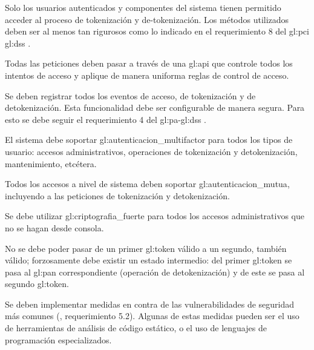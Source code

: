 {
  Solo los usuarios autenticados y componentes del sistema tienen permitido
  acceder al proceso de tokenización y de-tokenización. Los métodos utilizados
  deben ser al menos tan rigurosos como lo indicado en el requerimiento 8 del
  \gls{gl:pci} \gls{gl:dss} \cite{pci_dss}.

  {
    Todas las peticiones deben pasar a través de una \gls{gl:api} que controle
    todos los intentos de acceso y aplique de manera uniforma reglas de
    control de acceso.
  }

  {
    Se deben registrar todos los eventos de acceso, de tokenización y
    de detokenización. Esta funcionalidad debe ser configurable de manera
    segura. Para esto se debe seguir el requerimiento 4 del
    \gls{gl:pa}-\gls{gl:dss} \cite{dss_pa}.
  }

  {
    El sistema debe soportar \gls{gl:autenticacion_multifactor} para todos
    los tipos de usuario: accesos administrativos, operaciones de tokenización
    y detokenización, mantenimiento, etcétera.
  }

  {
    Todos los accesos a nivel de sistema deben soportar
    \gls{gl:autenticacion_mutua}, incluyendo a las peticiones de tokenización
    y detokenización.
  }

  {
    Se debe utilizar \gls{gl:criptografia_fuerte} para todos los accesos
    administrativos que no se hagan desde consola.
  }
}

{
  No se debe poder pasar de un primer \gls{gl:token} válido a un segundo,
  también válido; forzosamente debe existir un estado intermedio: del primer
  \gls{gl:token} se pasa al \gls{gl:pan} correspondiente (operación de
  detokenización) y de este se pasa al segundo \gls{gl:token}.
}

{
  Se deben implementar medidas en contra de las vulnerabilidades de
  seguridad más comunes (\cite{dss_pa}, requerimiento 5.2). Algunas de estas
  medidas pueden ser el uso de herramientas de análisis de código estático,
  o el uso de lenguajes de programación especializados.
}

